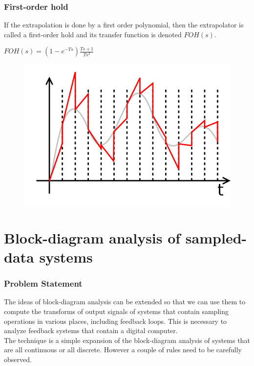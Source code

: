 \begin{frame}
	\frametitle{First-order hold}
	If the extrapolation is done by a first order polynomial, then the extrapolator is called a first-order hold and its transfer function is denoted $FOH(s)$. 
	\begin{center}
		$FOH(s)=(1-e^{-Ts})\frac{Ts+1}{Ts^2}$
	\end{center}
	\vspace{-0.5em}
	\begin{figure}
		\includegraphics[width=0.5\linewidth]{foh}
	\end{figure}
\end{frame}

\section{Block-diagram analysis of sampled-data systems}

\begin{frame}
	\frametitle{Problem Statement}
	\justify
	The ideas of block-diagram analysis can be extended so that we can use them to compute the transforms of output signals of systems that contain sampling operations in various places, including feedback loops. This is necessary to analyze feedback systems that contain a digital computer.\\
	\vspace{1em}
	The technique is a simple expansion of the block-diagram analysis of systems that are all continuous or all discrete. However a couple of rules need to be carefully observed. 
\end{frame}

